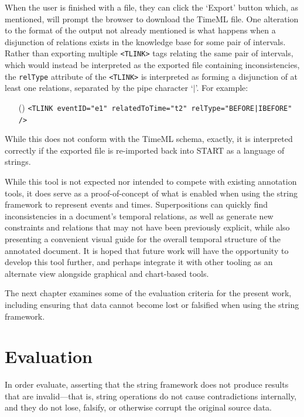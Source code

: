 \documentclass[a4paper,12pt,leqno]{article}
\newcommand{\ipp}{(\refstepcounter{equation}\theequation)}
\begin{document}
When the user is finished with a file, they can click the `Export' button which, as mentioned, will prompt the browser to download the TimeML file. One alteration to the format of the output not already mentioned is what happens when a disjunction of relations exists in the knowledge base for some pair of intervals. Rather than exporting multiple \verb|<TLINK>| tags relating the same pair of intervals, which would instead be interpreted as the exported file containing inconsistencies, the \verb|relType| attribute of the \verb|<TLINK>| is interpreted as forming a disjunction of at least one relations, separated by the pipe character `$|$'. For example:
\begin{itemize}
	\item[\ipp] \verb!<TLINK eventID="e1" relatedToTime="t2" relType="BEFORE|IBEFORE" />!
\end{itemize}
While this does not conform with the TimeML schema, exactly, it is interpreted correctly if the exported file is re-imported back into START as a language of strings.

While this tool is not expected nor intended to compete with existing annotation tools, it does serve as a proof-of-concept of what is enabled when using the string framework to represent events and times. Superpositions can quickly find inconsistencies in a document's temporal relations, as well as generate new constraints and relations that may not have been previously explicit, while also presenting a convenient visual guide for the overall temporal structure of the annotated document. It is hoped that future work will have the opportunity to develop this tool further, and perhaps integrate it with other tooling as an alternate view alongside graphical and chart-based tools.

The next chapter examines some of the evaluation criteria for the present work, including ensuring that data cannot become lost or falsified when using the string framework.%

\newpage
\section{Evaluation}\label{sec:evaluation}
In order evaluate, asserting that the string framework does not produce results that are invalid---that is, string operations do not cause contradictions internally, and they do not lose, falsify, or otherwise corrupt the original source data.%
\end{document}
